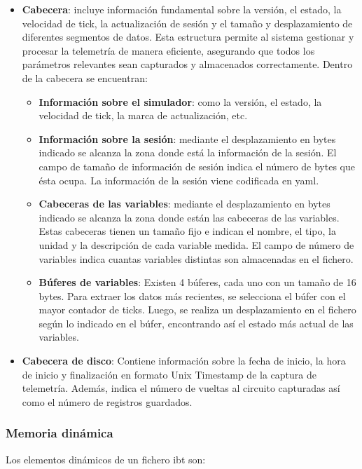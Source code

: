 \begin{itemize}
    \item \textbf{Cabecera}: incluye información fundamental sobre la versión, el estado, la velocidad de tick, la actualización de sesión y el tamaño y desplazamiento de diferentes segmentos de datos. Esta estructura permite al sistema gestionar y procesar la telemetría de manera eficiente, asegurando que todos los parámetros relevantes sean capturados y almacenados correctamente. Dentro de la cabecera se encuentran:
    \begin{itemize}
        \item \textbf{Información sobre el simulador}: como la versión, el estado, la velocidad de tick, la marca de actualización, etc.
        \item \textbf{Información sobre la sesión}: mediante el desplazamiento en bytes indicado se alcanza la zona donde está la información de la sesión. El campo de tamaño de información de sesión indica el número de bytes que ésta ocupa. La información de la sesión viene codificada en \ac{yaml}.
        \item \textbf{Cabeceras de las variables}: mediante el desplazamiento en bytes indicado se alcanza la zona donde están las cabeceras de las variables. Estas cabeceras tienen un tamaño fijo e indican el nombre, el tipo, la unidad y la descripción de cada variable medida. El campo de número de variables indica cuantas variables distintas son almacenadas en el fichero.
        \item \textbf{Búferes de variables}: Existen 4 búferes, cada uno con un tamaño de 16 bytes. Para extraer los datos más recientes, se selecciona el búfer con el mayor contador de ticks. Luego, se realiza un desplazamiento en el fichero según lo indicado en el búfer, encontrando así el estado más actual de las variables.
    \end{itemize}
    \item \textbf{Cabecera de disco}: Contiene información sobre la fecha de inicio, la hora de inicio y finalización en formato Unix Timestamp  de la captura de telemetría. Además, indica el número de vueltas al circuito capturadas así como el número de registros guardados.
\end{itemize}

\subsubsection*{Memoria dinámica}

Los elementos dinámicos de un fichero \ac{ibt} son:

